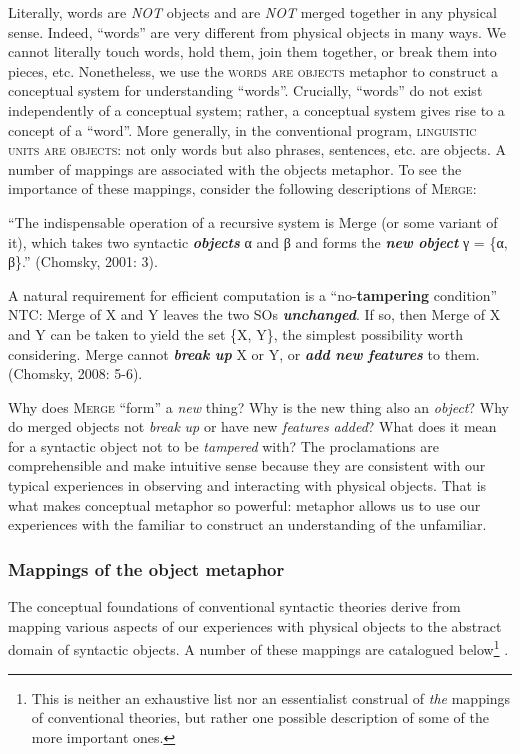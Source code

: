   Literally, words are \textit{NOT} objects and are \textit{NOT} merged together in any physical sense. Indeed, “words” are very different from physical objects in many ways. We cannot literally touch words, hold them, join them together, or break them into pieces, etc. Nonetheless, we use the \textsc{words} \textsc{are} \textsc{objects} metaphor to construct a conceptual system for understanding “words”. Crucially, “words” do not exist independently of a conceptual system; rather, a conceptual system gives rise to a concept of a “word”. More generally, in the conventional program, \textsc{linguistic} \textsc{units} \textsc{are} \textsc{objects}: not only words but also phrases, sentences, etc. are objects. A number of mappings are associated with the objects metaphor. To see the importance of these mappings, consider the following descriptions of \textsc{Merge}: 

“The indispensable operation of a recursive system is Merge (or some variant of it), which takes two syntactic \textbf{\textit{objects}} α and β and forms the \textbf{\textit{new} \textit{object}} γ = \{α, β\}.” (Chomsky, 2001: 3).

A natural requirement for efficient computation is a “no-\textbf{tampering} condition” NTC: Merge of X and Y leaves the two SOs \textbf{\textit{unchanged}}. If so, then Merge of X and Y can be taken to yield the set \{X, Y\}, the simplest possibility worth considering. Merge cannot \textbf{\textit{break} \textit{up}} X or Y, or \textbf{\textit{add} \textit{new} \textit{features}} to them. (Chomsky, 2008: 5-6).

  Why does \textsc{Merge} “form” a \textit{new} thing? Why is the new thing also an \textit{object}? Why do merged objects not \textit{break} \textit{up} or have new \textit{features} \textit{added}? What does it mean for a syntactic object not to be \textit{tampered} with? The proclamations are comprehensible and make intuitive sense because they are consistent with our typical experiences in observing and interacting with physical objects. That is what makes conceptual metaphor so powerful: metaphor allows us to use our experiences with the familiar to construct an understanding of the unfamiliar. 

\subsubsection{Mappings of the object metaphor}

The conceptual foundations of conventional syntactic theories derive from mapping various aspects of our experiences with physical objects to the abstract domain of syntactic objects. A number of these mappings are catalogued below\footnote{This is neither an exhaustive list nor an essentialist construal of \textit{the} mappings of conventional theories, but rather one possible description of some of the more important ones.} .

